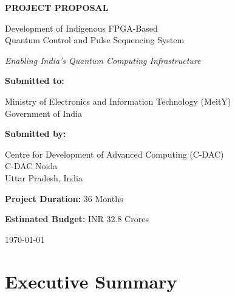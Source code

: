 \documentclass[12pt,a4paper]{article}
\begin{document}
\begin{titlepage}
    \centering
    \vspace*{1cm}
    
    {\huge\bfseries\color{quantumblue} PROJECT PROPOSAL\par}
    \vspace{0.5cm}
    {\LARGE Development of Indigenous FPGA-Based\\[0.3cm] Quantum Control and Pulse Sequencing System\par}
    
    \vspace{1.5cm}
    
    {\large\textit{Enabling India's Quantum Computing Infrastructure}\par}
    
    \vspace{2cm}
    
    {\Large\textbf{Submitted to:}\par}
    \vspace{0.5cm}
    {\large Ministry of Electronics and Information Technology (MeitY)\\
    Government of India\par}
    
    \vspace{2cm}
    
    {\Large\textbf{Submitted by:}\par}
    \vspace{0.5cm}
    {\large Centre for Development of Advanced Computing (C-DAC)\\
    C-DAC Noida\\
    Uttar Pradesh, India\par}
    
    \vspace{2cm}
    
    {\large\textbf{Project Duration:} 36 Months\par}
    \vspace{0.3cm}
    {\large\textbf{Estimated Budget:} INR 32.8 Crores\par}
    
    \vfill
    
    {\large \today\par}
\end{titlepage}

\tableofcontents
\newpage

\section*{Executive Summary}
\end{document}
